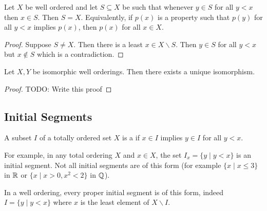 \documentclass[a4paper]{scrartcl}
\begin{document}
\begin{proposition}[Induction]
  Let $X$ be well ordered and let $S \subseteq X$ be such that whenever $y \in S$ for all $y < x$ then $x \in S$. Then $S = X$. Equivalently, if $p(x)$ is a property such that $p(y)$ for all $y < x$ implies $p(x)$, then $p(x)$ for all $x \in X$.
\end{proposition}
\begin{proof}
  Suppose $S \neq X$. Then there is a least $x \in X \backslash S$. Then $y \in S$ for all $y < x$ but $x \not \in S$ which is a contradiction.
\end{proof}

\begin{proposition}
  Let $X, Y$ be isomorphic well orderings. Then there exists a unique isomorphism.
\end{proposition}
\begin{proof}
  {\color{red} TODO: Write this proof}
\end{proof}

\subsection{Initial Segments}

\vspace{\baselineskip}

\begin{definition}
  A subset $I$ of a totally ordered set $X$ is a  if $x \in I$ implies $y \in I$ for all $y < x$.
\end{definition}

For example, in any total ordering $X$ and $x \in X$, the set $I_x = \{y \mid y < x\}$ is an initial segment. Not all initial segments are of this form (for example $\{x \mid x \leq 3\}$ in $\mathbb{R}$ or $\{x \mid x > 0, x^2 < 2\}$ in $\mathbb{Q}$).

In a well ordering, every proper initial segment is of this form, indeed $I = \{y \mid y < x\}$ where $x$ is the least element of $X \backslash I$.
\end{document}
